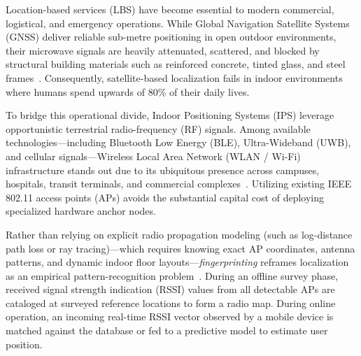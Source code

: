 
\label{sec:introduction}

Location-based services (LBS) have become essential to modern commercial, logistical, and emergency operations. While Global Navigation Satellite Systems (GNSS) deliver reliable sub-metre positioning in open outdoor environments, their microwave signals are heavily attenuated, scattered, and blocked by structural building materials such as reinforced concrete, tinted glass, and steel frames~\cite{torres2014ujiindoorloc}. Consequently, satellite-based localization fails in indoor environments where humans spend upwards of 80\% of their daily lives.

To bridge this operational divide, Indoor Positioning Systems (IPS) leverage opportunistic terrestrial radio-frequency (RF) signals. Among available technologies—including Bluetooth Low Energy (BLE), Ultra-Wideband (UWB), and cellular signals—Wireless Local Area Network (WLAN / Wi-Fi) infrastructure stands out due to its ubiquitous presence across campuses, hospitals, transit terminals, and commercial complexes~\cite{feng2022survey}. Utilizing existing IEEE 802.11 access points (APs) avoids the substantial capital cost of deploying specialized hardware anchor nodes.

Rather than relying on explicit radio propagation modeling (such as log-distance path loss or ray tracing)—which requires knowing exact AP coordinates, antenna patterns, and dynamic indoor floor layouts—\emph{fingerprinting} reframes localization as an empirical pattern-recognition problem~\cite{torres2014ujiindoorloc, torres2015comprehensive}. During an offline survey phase, received signal strength indication (RSSI) values from all detectable APs are cataloged at surveyed reference locations to form a radio map. During online operation, an incoming real-time RSSI vector observed by a mobile device is matched against the database or fed to a predictive model to estimate user position.

